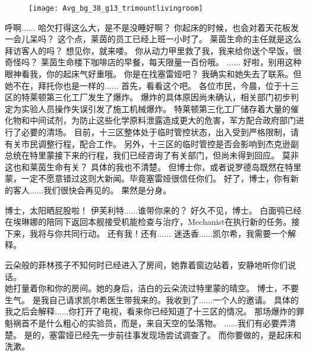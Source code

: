\documentclass[openany]{book}
\begin{document}
\begin{figure}[h]
    \centering
    \texttt{[image: Avg\_bg\_38\_g13\_trimountlivingroom]}
\end{figure}
\begin{dialogue}
     呼啊......
     哈欠打得这么大，是不是没睡好啊？
     你起床的时候，也会对着天花板发一会儿呆吗？
     这个点，莱茵的员工已经上班一小时了。
     莱茵生命的主任就是这么拜访客人的吗？
     想见你，就来喽。
     你从动力甲里救了我，我来给你送个早饭，很奇怪吗？
     莱茵生命楼下咖啡店的早餐，每天限量一百份哦。
     ......
     好啦，别用这种眼神看我，你的起床气好重哦。
     你是在找塞雷娅吧？
     我确实和她失去了联系。但她不在，拜托你也是一样的......
     首先，看看这个吧。
     各位市民，今晨，位于十三区的特莱顿第三化工厂发生了爆炸。
     爆炸的具体原因尚未确认，相关部门初步判定为实验人员操作失误引发了施工机械爆炸。
     特莱顿第三化工厂储存着大量的催化物和中间试剂，为防止这些化学原料泄露造成更大的危害，军方配合政府部门进行了必要的清场。
     目前，十三区整体处于临时管控状态，出入受到严格限制，请有关市民调整行程，配合工作。
     另外，十三区的临时管控是否会影响到杰克逊副总统在特里蒙接下来的行程，我们已经咨询了有关部门，但尚未得到回应。
     莫非这也和莱茵生命有关？
     具体的我也不清楚。
     但博士你，或者说罗德岛既然在特里蒙，一定不愿意错过这则大新闻。毕竟塞雷娅很信任你们。
     好了，博士，你有新的客人......我们很快会再见的。
     果然是分身。
\end{dialogue}
\par

\begin{dialogue}
     博士，太阳晒屁股啦！
     伊芙利特......谁带你来的？
     好久不见，博士。
     白面鸮已经在埃琳娜的陪同下返回本舰接受机能检查与治疗，Mechanist在执行新的任务。接下来，我将与你共同行动。
     还有我！还有......
     迷迭香......凯尔希，我需要一个解释。\par
    云朵般的菲林孩子不知何时已经进入了房间，她靠着窗边站着，安静地听你们说话。\\
    她打量着你和你的房间。她的身后，洁白的云朵流过特里蒙的晴空。
     博士，不要生气。
     是我自己请求凯尔希医生带我来的。我收到了......一个人的邀请。
     具体的我之后会解释......你打开了电视，看来你已经知道了十三区的情况。
     那场爆炸的罪魁祸首不是什么粗心的实验员，而是，来自天空的坠落物。
     ......我们有必要弄清楚。
     是的，塞雷娅已经先一步前往事发现场尝试调查了。
     而你要做的，是起床和洗漱。
\end{dialogue}
\par
\end{document}
